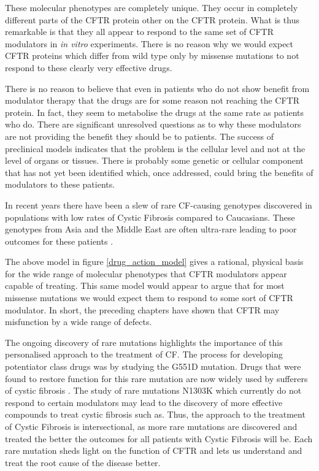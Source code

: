 These molecular phenotypes are completely unique. They occur in completely different parts of the CFTR protein other on the CFTR protein. What is thus remarkable is that they all appear to respond to the same set of CFTR modulators in \textit{in vitro} experiments. There is no reason why we would expect CFTR proteins which differ from wild type only by missense mutations to not respond to these clearly very effective drugs.

There is no reason to believe that even in patients who do not show benefit from modulator therapy that the drugs are for some reason not reaching the CFTR protein. In fact, they seem to metabolise the drugs at the same rate as patients who do. There are significant unresolved questions as to why these modulators are not providing the benefit they should be to patients. The success of preclinical models indicates that the problem is the cellular level and not at the level of organs or tissues. There is probably some genetic or cellular component that has not yet been identified which, once addressed, could bring the benefits of modulators to these patients.



In recent years there have been a slew of rare CF-causing genotypes discovered in populations with low rates of Cystic Fibrosis compared to Caucasians. These genotypes from Asia and the Middle East are often ultra-rare leading to poor outcomes for these patients \cite{}. 



The above model in figure \ref{drug_action_model} gives a rational, physical basis for the wide range of molecular phenotypes that CFTR modulators appear capable of treating. This same model would appear to argue that for most missense mutations we would expect them to respond to some sort of CFTR modulator. In short, the preceding chapters have shown that CFTR may misfunction by a wide range of defects. 

The ongoing discovery of rare mutations highlights the importance of this personalised approach to the treatment of CF. The process for developing potentiator class drugs was by studying the G551D mutation. Drugs that were found to restore function for this rare mutation are now widely used by sufferers of cystic fibrosis \cite{vangoor2009}. The study of rare mutations N1303K which currently do not respond to certain modulators may lead to the discovery of more effective compounds to treat cystic fibrosis such as. Thus, the approach to the treatment of Cystic Fibrosis is intersectional, as more rare mutations are discovered and treated the better the outcomes for all patients with Cystic Fibrosis will be. Each rare mutation sheds light on the function of CFTR and lets us understand and treat the root cause of the disease better.

